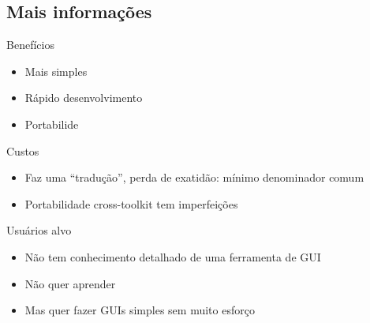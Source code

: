 

\subsection{Mais informações}

\begin{frame}
  \begin{multicols}{2}
    
    \begin{block}{Benefícios}
      \begin{itemize}
      \item Mais simples
      \item Rápido desenvolvimento
      \item Portabilide
      \end{itemize}
    \end{block}
    \vfill
    \columnbreak
    \begin{block}{Custos}
      \begin{itemize}
      \item Faz uma ``tradução'', perda de exatidão: mínimo denominador
        comum
      \item Portabilidade cross-toolkit tem imperfeições
      \end{itemize}
    \end{block}
  \end{multicols}

  \begin{block}{Usuários alvo}
    \begin{itemize}
    \item Não tem conhecimento detalhado de uma ferramenta de GUI
    \item Não quer aprender
    \item Mas quer fazer GUIs simples sem muito esforço
    \end{itemize}
  \end{block}

\end{frame}

